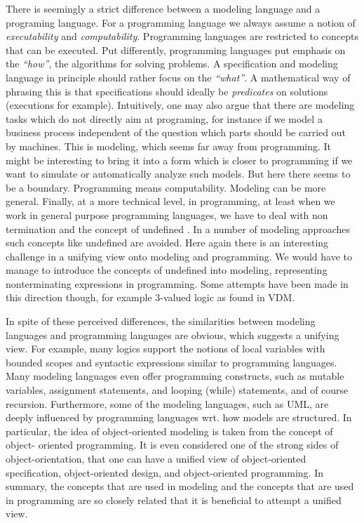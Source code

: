 There is seemingly a strict difference between a modeling
language and a programing language. For a
programming language we always assume a notion of {\em 
executability} and {\em computability}. Programming languages 
are restricted to concepts that can be
executed. Put differently, programming languages put emphasis on 
the {\em ``how''}, the algorithms for solving problems.
A specification and modeling language in principle should rather 
focus on the {\em ``what''}. A mathematical way of phrasing this is 
that specifications should ideally be {\em predicates} on solutions 
(executions for example). Intuitively, one may also argue that 
there are modeling tasks which do not directly aim at programing, 
for instance if we model a business process independent of the 
question which parts should be carried out by machines. This is 
modeling, which seems far away from programming. It might be 
interesting to bring it into a form which is closer to programming 
if we want to simulate or automatically analyze such models. But 
here there seems to be a boundary. Programming means computability. 
Modeling can be more general. Finally, at a more technical level, 
in programming, at least when we work in general purpose 
programming languages, we have to deal with non termination and the 
concept of undefined \cite{broy-chaos-2006}. 
In a number of modeling approaches such 
concepts like undefined are avoided. Here again 
there is an interesting challenge in a unifying
view onto modeling and programming. We would have to manage to
introduce the concepts of undefined into modeling, representing
nonterminating expressions in programming.  Some attempts have been
made in	this direction though, for example 3-valued logic as 
found in VDM.

In spite of these perceived differences, the similarities between
modeling languages and programming languages are obvious, which
suggests a unifying view. For example, many logics support the 
notions of local variables with bounded scopes and syntactic 
expressions similar to programming languages. Many modeling 
languages even offer programming constructs, such as mutable 
variables, 
assignment statements, and looping (while) statements, and of course recursion. Furthermore, some of the modeling 
languages, such as UML, are deeply influenced by programming 
languages wrt. how models are structured. In particular, the idea 
of object-oriented modeling is taken from the concept of object-
oriented programming. It is even considered one of the strong sides 
of object-orientation, that one can have a unified view of 
object-oriented specification, object-oriented design, and 
object-oriented programming. In summary, the concepts that 
are used in modeling and the concepts that are used in 
programming are so closely related that it is beneficial to attempt 
a unified view.

